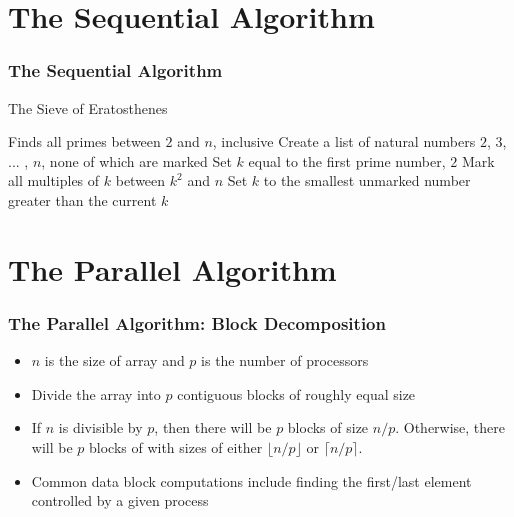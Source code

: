 \documentclass[13pt]{beamer}
\begin{document}
\section{The Sequential Algorithm} %
\begin{frame}
\frametitle{The Sequential Algorithm}
  \begin{algorithm}[H]
        \caption{The Sieve of Eratosthenes}
        \begin{algorithmic}
          \REQUIRE Finds all primes between $2$ and $n$, inclusive
          \STATE Create a list of natural numbers $2$, $3$, ... , $n$, none of which are marked
          \STATE Set $k$ equal to the first prime number, $2$
            \STATE Mark all multiples of $k$ between $k^2$ and $n$
            \STATE Set $k$ to the smallest unmarked number greater than the current $k$
          \ENDWHILE
        \end{algorithmic}
        \end{algorithm}
\end{frame}

\section{The Parallel Algorithm} %

\begin{frame}
\frametitle{The Parallel Algorithm: Block Decomposition}
  \begin{itemize}
    \item $n$ is the size of array and $p$ is the number of processors
    \item Divide the array into $p$ contiguous blocks of roughly equal size
    \item If $n$ is divisible by $p$, then there will be $p$ blocks of size $n / p$. Otherwise, there will be $p$ blocks of with sizes of either $\lfloor n / p \rfloor$ or $\lceil n / p \rceil$.
    \item Common data block computations include finding the first/last element controlled by a given process
  \end{itemize}
\end{frame}
\end{document}
